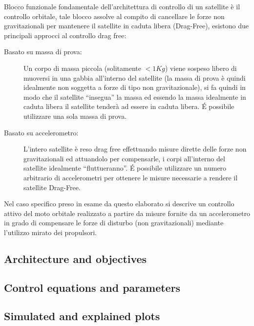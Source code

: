 Blocco funzionale fondamentale dell'architettura di controllo di un satellite è
il controllo orbitale, tale blocco assolve al compito di cancellare le forze
non gravitazionali per mantenere il satellite in caduta libera (Drag-Free),
esistono due principali approcci al controllo drag free:

\begin{description}
\item[Basato su massa di prova:]  Un corpo di massa piccola (solitamente
$<1Kg$) viene sospeso libero di muoversi in una gabbia all'interno del satellite
(la massa di prova è quindi idealmente non soggetta a forze di tipo non
gravitazionale), si fa quindi in modo che il satellite ``insegua'' la massa ed
essendo la massa idealmente in caduta libera il satellite tenderà ad essere in
caduta libera. \'E possibile utilizzare una sola massa di prova.
\item[Basato su accelerometro:] L'intero satellite è reso drag free effettuando
misure dirette delle forze non gravitazionali ed attuandolo per compensarle, i
corpi all'interno del satellite idealmente ``fluttueranno''. \'E possibile
utilizzare un numero arbitrario di accelerometri per ottenere le misure
necessarie a rendere il satellite Drag-Free.
\end{description}

Nel caso specifico preso in esame da questo elaborato si descrive un controllo
attivo del moto orbitale realizzato a partire da misure fornite da un
accelerometro in grado di compensare le forze di disturbo (non gravitazionali)
mediante l'utilizzo mirato dei propulsori.

\subsection{Architecture and objectives}

\subsection{Control equations and parameters}

\subsection{Simulated and explained plots}

